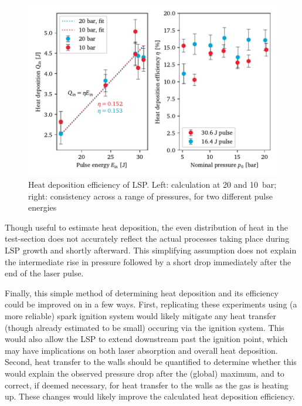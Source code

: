            \begin{figure}[h]
                \centering
                \includegraphics[]{assets/5 results/heatEfficiency}
                \caption[Heat deposition efficiency of LSP]{Heat deposition efficiency of LSP. Left: calculation at 20 and 10~bar; right: consistency across a range of pressures, for two different pulse energies}
                \label{fig:heatEfficiency}
            \end{figure}

            Though useful to estimate heat deposition, the even distribution of heat in the test-section does not accurately reflect the actual processes taking place during LSP growth and shortly afterward. This simplifying assumption does not explain the intermediate rise in pressure followed by a short drop immediately after the end of the laser pulse.

            Finally, this simple method of determining heat deposition and its efficiency could be improved on in a few ways. First, replicating these experiments using (a more reliable) spark ignition system would likely mitigate any heat transfer (though already estimated to be small) occuring via the ignition system. This would also allow the LSP to extend downstream past the ignition point, which may have implications on both laser absorption and overall heat deposition. Second, heat transfer to the walls should be quantified to determine whether this would explain the observed pressure drop after the (global) maximum, and to correct, if deemed necessary, for heat transfer to the walls as the gas is heating up. These changes would likely improve the calculated heat deposition efficiency.
    
